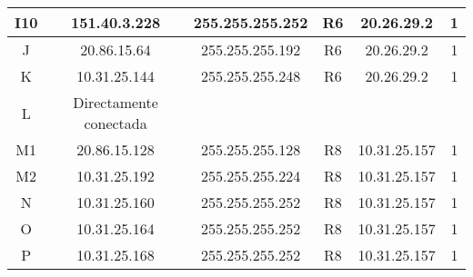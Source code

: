\begin{tabular}{|c|c|c|c|c|c|}
 	I10 & 151.40.3.228 & 255.255.255.252 & R6 & 20.26.29.2 & 1 \\
	\hline
	J & 20.86.15.64 & 255.255.255.192 & R6 & 20.26.29.2 & 1\\
 	\hline
	K & 10.31.25.144 & 255.255.255.248 & R6 & 20.26.29.2 & 1\\
 	\hline
	L & Directamente conectada &&&&\\
	\hline
	M1 & 20.86.15.128 & 255.255.255.128 & R8 & 10.31.25.157 & 1\\
	\hline
	M2 & 10.31.25.192 & 255.255.255.224 & R8 & 10.31.25.157 & 1\\
	\hline
	N & 10.31.25.160 & 255.255.255.252 & R8 & 10.31.25.157 & 1\\
	\hline
	O & 10.31.25.164 & 255.255.255.252 & R8 & 10.31.25.157 & 1\\
	\hline
	P & 10.31.25.168 & 255.255.255.252 & R8 & 10.31.25.157 & 1\\
	\hline
\end{tabular}

